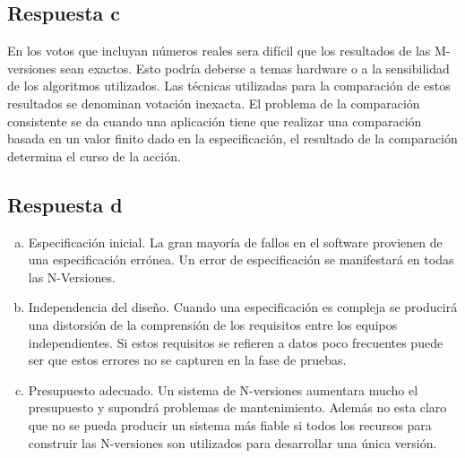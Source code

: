 \subsection{Respuesta c}

En los votos que incluyan números reales sera difícil que los resultados de las
M-versiones sean exactos. Esto podría deberse a temas hardware o a la
sensibilidad de los algoritmos utilizados. Las técnicas utilizadas para la
comparación de estos resultados se denominan votación inexacta. El problema de
la comparación consistente se da cuando una aplicación tiene que realizar una
comparación basada en un valor finito dado en la especificación, el resultado de
la comparación determina el curso de la acción.

\subsection{Respuesta d}

\begin{enumerate}[a)]
	\item Especificación inicial. La gran mayoría de fallos en el software
		provienen de una especificación errónea. Un error de
		especificación se manifestará en todas las N-Versiones.
	\item Independencia del diseño. Cuando una especificación es compleja se
		producirá una distorsión de la comprensión de los requisitos
		entre los equipos independientes. Si estos requisitos se
		refieren a datos poco frecuentes puede ser que estos errores no
		se capturen en la fase de pruebas.
	\item Presupuesto adecuado. Un sistema de N-versiones aumentara mucho el
		presupuesto y supondrá problemas de mantenimiento. Además no
		esta claro que no se pueda producir un sistema más fiable si
		todos los recursos para construir las N-versiones son utilizados
		para desarrollar una única versión.
\end{enumerate}
